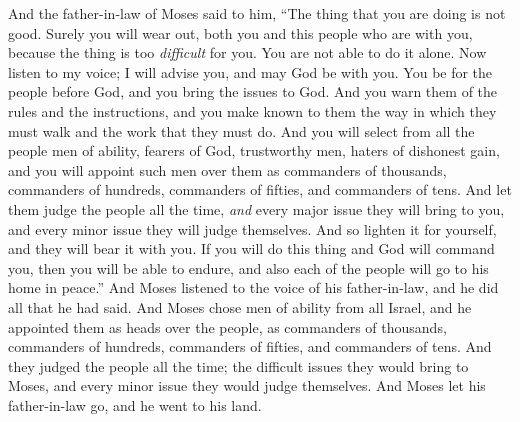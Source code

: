 \begin{biblechapter}
\verse And the father-in-law of Moses said to him, “The thing that you are doing is not good.
\verse Surely you will wear out, both you and this people who are with you, because the thing is too \textit{difficult} for you. You are not able to do it alone.
\verse Now listen to my voice; I will advise you, and may God be with you. You be for the people before God, and you bring the issues to God.
\verse And you warn them of the rules and the instructions, and you make known to them the way in which they must walk and the work that they must do.
\verse And you will select from all the people men of ability, fearers of God, trustworthy men, haters of dishonest gain, and you will appoint such men over them as commanders of thousands, commanders of hundreds, commanders of fifties, and commanders of tens.
\verse And let them judge the people all the time, \textit{and} every major issue they will bring to you, and every minor issue they will judge themselves. And so lighten it for yourself, and they will bear it with you.
\verse If you will do this thing and God will command you, then you will be able to endure, and also each of the people will go to his home in peace.”
\verse And Moses listened to the voice of his father-in-law, and he did all that he had said.
\verse And Moses chose men of ability from all Israel, and he appointed them as heads over the people, as commanders of thousands, commanders of hundreds, commanders of fifties, and commanders of tens.
\verse And they judged the people all the time; the difficult issues they would bring to Moses, and every minor issue they would judge themselves.
\verse And Moses let his father-in-law go, and he went to his land.
\end{biblechapter}

